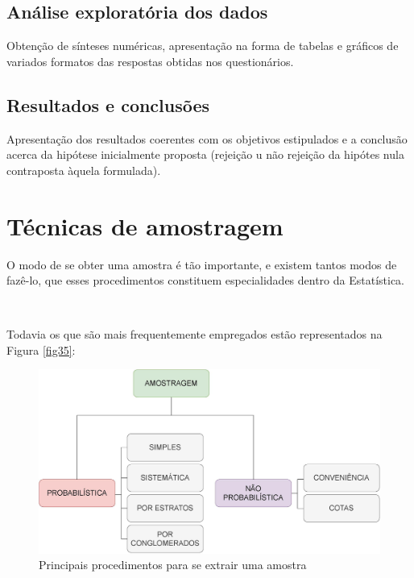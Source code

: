 \documentclass[
]{book}
\begin{document}
\hypertarget{anuxe1lise-exploratuxf3ria-dos-dados}{%
\subsection{Análise exploratória dos dados}\label{anuxe1lise-exploratuxf3ria-dos-dados}}

Obtenção de sínteses numéricas, apresentação na forma de tabelas e gráficos de variados formatos das respostas obtidas nos questionários.

\hypertarget{resultados-e-conclusuxf5es}{%
\subsection{Resultados e conclusões}\label{resultados-e-conclusuxf5es}}

Apresentação dos resultados coerentes com os objetivos estipulados e a conclusão acerca da hipótese inicialmente proposta (rejeição u não rejeição da hipótes nula contraposta àquela formulada).

\hypertarget{tuxe9cnicas-de-amostragem}{%
\section{Técnicas de amostragem}\label{tuxe9cnicas-de-amostragem}}

\hfill\break

O modo de se obter uma amostra é tão importante, e existem tantos modos de fazê-lo, que esses procedimentos constituem especialidades dentro da Estatística.

~

Todavia os que são mais frequentemente empregados estão representados na Figura \ref{fig35}:

\hfill\break

\begin{figure}

{\centering \includegraphics[width=0.8\linewidth]{images7/amostragem} 

}

\caption{Principais procedimentos para se extrair uma amostra}\label{fig:fig35}
\end{figure}
\end{document}
